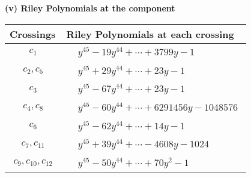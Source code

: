 \documentclass[1p]{elsarticle_modified}
\theoremstyle{definition}
\begin{document}
\flushleft \textbf{(v) Riley Polynomials at the component}\newline \\
\begin{tabular}{m{50pt}|m{274pt}}
Crossings & \hspace{64pt}Riley Polynomials at each crossing \\
\hline $$\begin{aligned}c_{1}\end{aligned}$$&$\begin{aligned}
&y^{45}-19 y^{44}+\cdots+3799 y-1
\end{aligned}$\\
\hline $$\begin{aligned}c_{2},c_{5}\end{aligned}$$&$\begin{aligned}
&y^{45}+29 y^{44}+\cdots+23 y-1
\end{aligned}$\\
\hline $$\begin{aligned}c_{3}\end{aligned}$$&$\begin{aligned}
&y^{45}-67 y^{44}+\cdots+23 y-1
\end{aligned}$\\
\hline $$\begin{aligned}c_{4},c_{8}\end{aligned}$$&$\begin{aligned}
&y^{45}-60 y^{44}+\cdots+6291456 y-1048576
\end{aligned}$\\
\hline $$\begin{aligned}c_{6}\end{aligned}$$&$\begin{aligned}
&y^{45}-62 y^{44}+\cdots+14 y-1
\end{aligned}$\\
\hline $$\begin{aligned}c_{7},c_{11}\end{aligned}$$&$\begin{aligned}
&y^{45}+39 y^{44}+\cdots-4608 y-1024
\end{aligned}$\\
\hline $$\begin{aligned}c_{9},c_{10},c_{12}\end{aligned}$$&$\begin{aligned}
&y^{45}-50 y^{44}+\cdots+70 y^2-1
\end{aligned}$\\
\hline
\end{tabular}\\~\\
\end{document}
